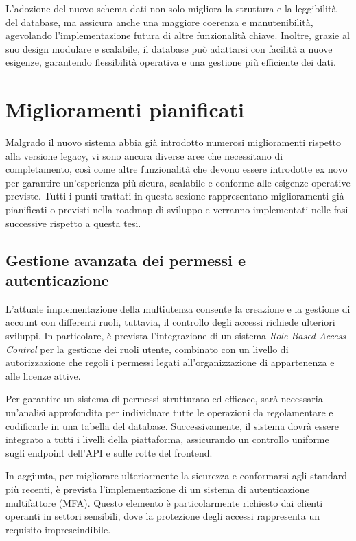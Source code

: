 L’adozione del nuovo schema dati non solo migliora la struttura e la leggibilità del database, ma assicura anche una maggiore coerenza e manutenibilità, agevolando l’implementazione futura di altre funzionalità chiave. Inoltre, grazie al suo design modulare e scalabile, il database può adattarsi con facilità a nuove esigenze, garantendo flessibilità operativa e una gestione più efficiente dei dati.

\section{Miglioramenti pianificati}
Malgrado il nuovo sistema abbia già introdotto numerosi miglioramenti rispetto alla versione legacy, vi sono ancora diverse aree che necessitano di completamento, così come altre funzionalità che devono essere introdotte ex novo per garantire un'esperienza più sicura, scalabile e conforme alle esigenze operative previste. Tutti i punti trattati in questa sezione rappresentano miglioramenti già pianificati o previsti nella roadmap di sviluppo e verranno implementati nelle fasi successive rispetto a questa tesi.

\subsection{Gestione avanzata dei permessi e autenticazione}
L’attuale implementazione della multiutenza consente la creazione e la gestione di account con differenti ruoli, tuttavia, il controllo degli accessi richiede ulteriori sviluppi. In particolare, è prevista l’integrazione di un sistema \textit{Role-Based Access Control} per la gestione dei ruoli utente, combinato con un livello di autorizzazione che regoli i permessi legati all’organizzazione di appartenenza e alle licenze attive.

Per garantire un sistema di permessi strutturato ed efficace, sarà necessaria un’analisi approfondita per individuare tutte le operazioni da regolamentare e codificarle in una tabella del database. Successivamente, il sistema dovrà essere integrato a tutti i livelli della piattaforma, assicurando un controllo uniforme sugli endpoint dell’API e sulle rotte del frontend.

In aggiunta, per migliorare ulteriormente la sicurezza e conformarsi agli standard più recenti, è prevista l’implementazione di un sistema di autenticazione multifattore (MFA). Questo elemento è particolarmente richiesto dai clienti operanti in settori sensibili, dove la protezione degli accessi rappresenta un requisito imprescindibile.

